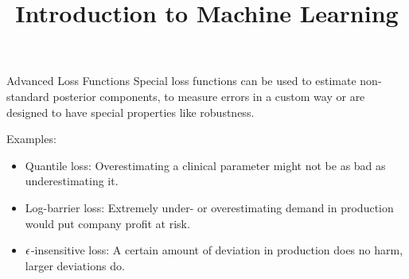 \documentclass[11pt,compress,t,notes=noshow, xcolor=table]{beamer}
\title{Introduction to Machine Learning}
\institute{\href{https://compstat-lmu.github.io/lecture_i2ml/}{compstat-lmu.github.io/lecture\_i2ml}}
\date{}
\begin{document}

\begin{vbframe}{Advanced Loss Functions}
Special loss functions can be used to estimate non-standard posterior components, 
    to measure errors in a custom way or are designed to have special properties like robustness.

\vspace{1cm}

Examples:
\begin{itemize}
\item Quantile loss: Overestimating a clinical parameter might not be as bad as underestimating it.
\item Log-barrier loss: Extremely under- or overestimating demand in production would put company profit at risk.
\item $\epsilon$-insensitive loss: A certain amount of deviation in production does no harm, larger deviations do.
\end{itemize}
\end{vbframe}
\end{document}
